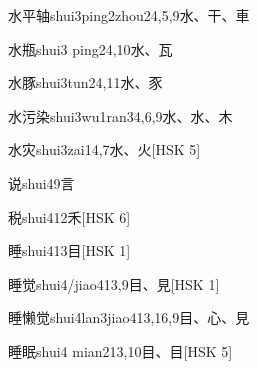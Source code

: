 \begin{EntryWithPhonetic}{水平轴}{shui3ping2zhou2}{4,5,9}{⽔、⼲、⾞}
\end{EntryWithPhonetic}

\begin{EntryWithPhonetic}{水瓶}{shui3 ping2}{4,10}{⽔、⽡}
\end{EntryWithPhonetic}

\begin{EntryWithPhonetic}{水豚}{shui3tun2}{4,11}{⽔、⾗}
\end{EntryWithPhonetic}

\begin{EntryWithPhonetic}{水污染}{shui3wu1ran3}{4,6,9}{⽔、⽔、⽊}
\end{EntryWithPhonetic}

\begin{EntryWithPhonetic}{水灾}{shui3zai1}{4,7}{⽔、⽕}[HSK 5]
\end{EntryWithPhonetic}

\begin{EntryWithPhonetic}{说}{shui4}{9}{⾔}
\end{EntryWithPhonetic}

\begin{EntryWithPhonetic}{税}{shui4}{12}{⽲}[HSK 6]
\end{EntryWithPhonetic}

\begin{EntryWithPhonetic}{睡}{shui4}{13}{⽬}[HSK 1]
\end{EntryWithPhonetic}

\begin{EntryWithPhonetic}{睡觉}{shui4/jiao4}{13,9}{⽬、⾒}[HSK 1]
\end{EntryWithPhonetic}

\begin{EntryWithPhonetic}{睡懒觉}{shui4lan3jiao4}{13,16,9}{⽬、⼼、⾒}
\end{EntryWithPhonetic}

\begin{EntryWithPhonetic}{睡眠}{shui4 mian2}{13,10}{⽬、⽬}[HSK 5]
\end{EntryWithPhonetic}

